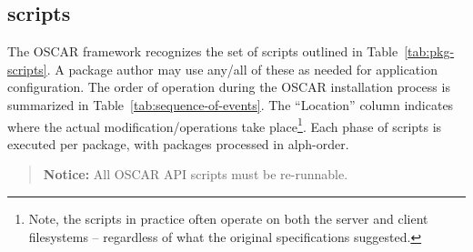 \subsection{scripts}
\label{sect:pkg-scripts}

The OSCAR framework recognizes the set of scripts outlined in
Table~\ref{tab:pkg-scripts}.  A package author may use any/all of these as
needed for application configuration.  The order of operation during the
OSCAR installation process is summarized in
Table~\ref{tab:sequence-of-events}.  The ``Location'' column indicates
where the actual modification/operations take place\footnote{Note, the
 scripts in practice often operate on both the server
and client filesystems -- regardless of what the original specifications
suggested.}.  Each phase of scripts is executed per package, with packages 
processed in alph-order.  

\begin{verse}
   {\bfseries Notice: } All OSCAR API scripts must be re-runnable.  
\end{verse}




